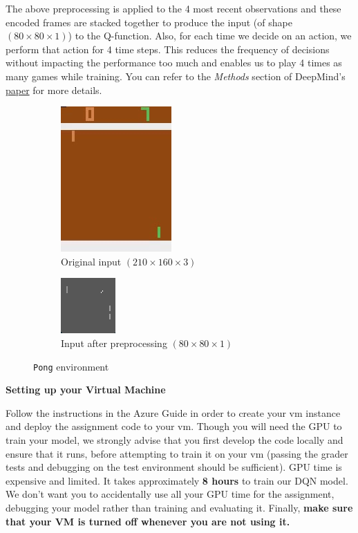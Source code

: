 The above preprocessing is applied to the 4 most recent observations and these encoded frames are stacked together to produce the input (of shape $(80 \times 80 \times 1)$) to the Q-function. Also, for each time we decide on an action, we perform that action for 4 time steps. This reduces the frequency of decisions without impacting the performance too much and enables us to play 4 times as many games while training. You can refer to the \textit{Methods} section of DeepMind's \href{https://storage.googleapis.com/deepmind-media/dqn/DQNNaturePaper.pdf}{paper} for more details. \\

\begin{figure}[H]
\centering
\begin{subfigure}[b]{.4\textwidth}
  \centering
  \includegraphics[width=.25\linewidth]{images/pong}
  \caption{Original input $ (210 \times 160 \times 3)$ }
  \label{fig:pong}
\end{subfigure}
\begin{subfigure}[b]{.4\textwidth}
  \centering
  \includegraphics[width=.25\linewidth]{images/pong_grey}
  \caption{Input after preprocessing $ (80 \times 80 \times 1 ) $}
  \label{fig:pong_grey}
\end{subfigure}
\caption{\texttt{Pong} environment}
\label{fig:pong_env}
\end{figure}

\textbf{Setting up your Virtual Machine}

Follow the instructions in the Azure Guide in order to create your vm instance and deploy the assignment code to your vm. Though you will need the GPU to train your model, we strongly advise that you first develop the code locally and ensure that it runs, before attempting to train it on your vm (passing the grader tests and debugging on the test environment should be sufficient). GPU time is expensive and limited. It takes approximately \textbf{8 hours} to train our DQN model. We don't want you to accidentally use all your GPU time for the assignment, debugging your model rather than training and evaluating it. Finally, \textbf{make sure that your VM is turned off whenever you are not using it.}

